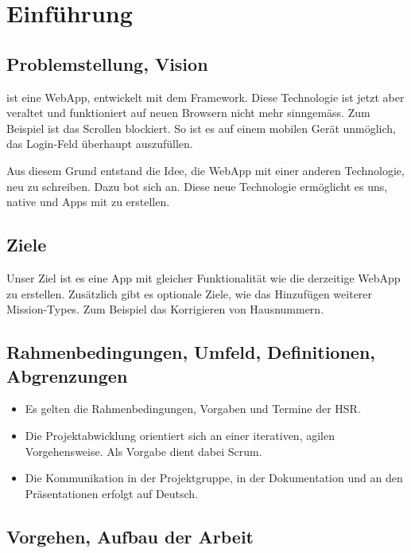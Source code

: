 \chapter{Einführung}
\label{tb-einfuehrung}

\section{Problemstellung, Vision}
\kort{} ist eine \gls{WebApp}, entwickelt mit dem  \gls{Framework}.
Diese Technologie ist jetzt aber veraltet und funktioniert auf neuen Browsern nicht mehr sinngemäss.
Zum Beispiel ist das Scrollen blockiert.
So ist es auf einem mobilen Gerät unmöglich, das Login-Feld überhaupt auszufüllen.

Aus diesem Grund entstand die Idee, die \kort{} \gls{WebApp} mit einer anderen Technologie, neu zu schreiben.
Dazu bot sich  an. 
Diese neue Technologie ermöglicht es uns, native  und  Apps mit  zu erstellen. 


\section{Ziele}
Unser Ziel ist es eine  App mit gleicher Funktionalität wie die derzeitige \gls{WebApp} zu erstellen.
Zusätzlich gibt es optionale Ziele, wie das Hinzufügen weiterer Mission-Types.
Zum Beispiel das Korrigieren von Hausnummern.


\section{Rahmenbedingungen, Umfeld, Definitionen, Abgrenzungen}
\begin{itemize}
\item Es gelten die Rahmenbedingungen, Vorgaben und Termine der HSR.
\item Die Projektabwicklung orientiert sich an einer iterativen, agilen Vorgehensweise. Als Vorgabe dient dabei Scrum.
\item Die Kommunikation in der Projektgruppe, in der Dokumentation und an den Präsentationen erfolgt auf Deutsch.
\end{itemize}


\section{Vorgehen, Aufbau der Arbeit}

